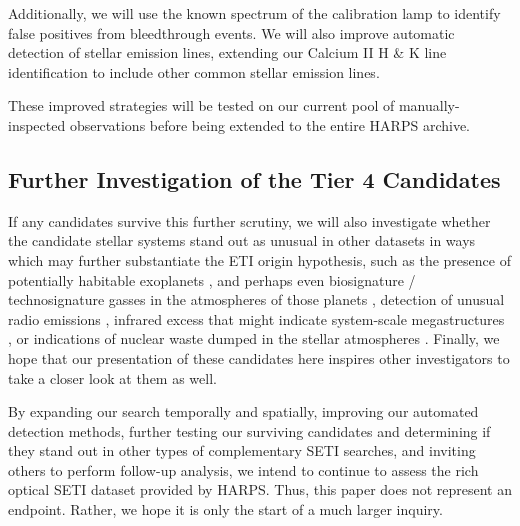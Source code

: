 \documentclass[twocolumn]{aastex701}
\begin{document}
Additionally, we will use the known spectrum of the calibration lamp to identify false positives from bleedthrough events.  We will also improve automatic detection of stellar emission lines, extending our Calcium II H \& K line identification to include other common stellar emission lines.

These improved strategies will be tested on our current pool of manually-inspected observations before being extended to the entire HARPS archive.
 
\subsection{Further Investigation of the Tier 4 Candidates}
\label{s:automatic_cosmic_ray}

If any candidates survive this further scrutiny, we will also investigate whether the candidate stellar systems stand out as unusual in other datasets in ways which may further substantiate the ETI origin hypothesis, such as the presence of potentially habitable exoplanets \citep{exoplanets}, and perhaps even biosignature / technosignature gasses in the atmospheres of those planets \citep{exoplanetbiosignatures,HAQQMISRA2022194}, detection of unusual radio emissions \citep{BACKUS1998651}, infrared excess that might indicate system-scale megastructures \citep{dysonspheres,TILGNER1998607}, or indications of nuclear waste dumped in the stellar atmospheres \citep{WHITMIRE1980149}. Finally, we hope that our presentation of these candidates here inspires other investigators to take a closer look at them as well.

By expanding our search temporally and spatially, improving our automated detection methods, further testing our surviving candidates and determining if they stand out in other types of complementary SETI searches, and inviting others to perform follow-up analysis, we intend to continue to assess the rich optical SETI dataset provided by HARPS. Thus, this paper does not represent an endpoint. Rather, we hope it is only the start of a much larger inquiry.
\end{document}
